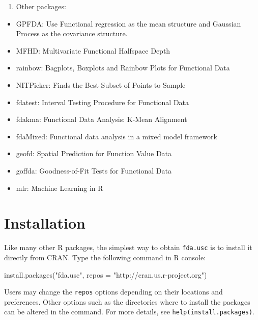 \documentclass[
]{book}
\newenvironment{Shaded}{\begin{snugshade}}{\end{snugshade}}
\newcommand{\AttributeTok}[1]{\textcolor[rgb]{0.77,0.63,0.00}{#1}}
\newcommand{\FunctionTok}[1]{\textcolor[rgb]{0.00,0.00,0.00}{#1}}
\newcommand{\NormalTok}[1]{#1}
\newcommand{\StringTok}[1]{\textcolor[rgb]{0.31,0.60,0.02}{#1}}
\providecommand{\tightlist}{%
  \setlength{\itemsep}{0pt}\setlength{\parskip}{0pt}}
\begin{document}
\begin{enumerate}
\def\labelenumi{\arabic{enumi}.}
\setcounter{enumi}{4}
\tightlist
\item
  {Other packages: }
\end{enumerate}

\begin{itemize}
\tightlist
\item
  {GPFDA}: Use Functional regression as the mean structure and Gaussian Process as the covariance structure.
\item
  {MFHD}: Multivariate Functional Halfspace Depth
\item
  {rainbow}: Bagplots, Boxplots and Rainbow Plots for Functional Data
\item
  {NITPicker}: Finds the Best Subset of Points to Sample
\item
  {fdatest}: Interval Testing Procedure for Functional Data
\item
  {fdakma}: Functional Data Analysis: K-Mean Alignment
\item
  {fdaMixed}: Functional data analysis in a mixed model framework
\item
  {geofd}: Spatial Prediction for Function Value Data
\item
  {goffda}: Goodness-of-Fit Tests for Functional Data
\item
  {mlr}: Machine Learning in R
\end{itemize}

\hypertarget{installation}{%
\section*{Installation}\label{installation}}

Like many other R packages, the simplest way to obtain \texttt{fda.usc} is to install it directly from CRAN. Type the following command in R console:

\begin{Shaded}
\begin{Highlighting}[]
\FunctionTok{install.packages}\NormalTok{(}\StringTok{"fda.usc"}\NormalTok{, }\AttributeTok{repos =} \StringTok{"http://cran.us.r{-}project.org"}\NormalTok{)}
\end{Highlighting}
\end{Shaded}

Users may change the \texttt{repos} options depending on their locations and preferences. Other options such as the directories where to install the packages can be altered in the command. For more details, see \texttt{help(install.packages)}.
\end{document}
